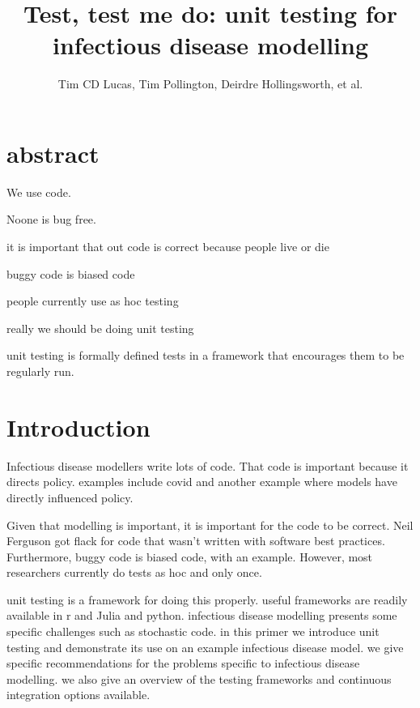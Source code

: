 \documentclass{article}
\title{Test, test me do: unit testing for infectious disease modelling}
\author{Tim CD Lucas, Tim Pollington, Deirdre Hollingsworth, et al.}
\begin{document}










\maketitle

\section{abstract}

We use code.

Noone is bug free.

it is important that out code is correct because people live or die

buggy code is biased code

people currently use as hoc testing

really we should be doing unit testing

unit testing is formally defined tests in a framework that encourages them to be regularly run.

\section{Introduction}

Infectious disease modellers write lots of code.
That code is important because it directs policy.
examples include covid and another example where models have directly influenced policy.

Given that modelling is important, it is important for the code to be correct.
Neil Ferguson got flack for code that wasn't written with software best practices.
Furthermore, buggy code is biased code, with an example.
However, most researchers currently do tests as hoc and only once.

unit testing is a framework for doing this properly.
useful frameworks are readily available in r and Julia and python.
infectious disease modelling presents some specific challenges such as stochastic code.
in this primer we introduce unit testing and demonstrate its use on an example infectious disease model.
we give specific recommendations for the problems specific to infectious disease modelling.
we also give an overview of the testing frameworks and continuous integration options available.
\end{document}
